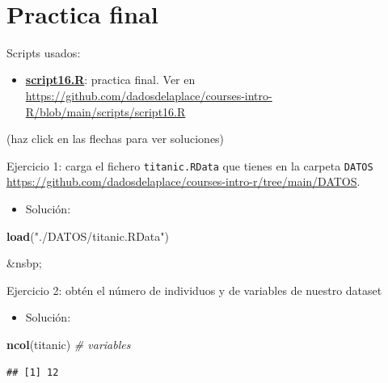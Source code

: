\documentclass[11pt,]{book}
\newenvironment{Shaded}{\begin{snugshade}}{\end{snugshade}}
\newcommand{\CommentTok}[1]{\textcolor[rgb]{0.37,0.37,0.37}{\textit{#1}}}
\newcommand{\KeywordTok}[1]{\textcolor[rgb]{0.27,0.27,0.27}{\textbf{#1}}}
\newcommand{\NormalTok}[1]{#1}
\newcommand{\StringTok}[1]{\textcolor[rgb]{0.5,0.5,0.5}{#1}}
\providecommand{\tightlist}{%
  \setlength{\itemsep}{0pt}\setlength{\parskip}{0pt}}
\begin{document}
~

\hypertarget{practica-final}{%
\section{Practica final}\label{practica-final}}

\begin{blackbox}

Scripts usados:

\begin{itemize}
\tightlist
\item
  \href{https://github.com/dadosdelaplace/courses-intro-R/blob/main/scripts/script16.R}{\textbf{script16.R}}: practica final. Ver en \url{https://github.com/dadosdelaplace/courses-intro-R/blob/main/scripts/script16.R}
\end{itemize}


\end{blackbox}

(haz click en las flechas para ver soluciones)

Ejercicio 1: carga el fichero \texttt{titanic.RData} que tienes en la carpeta \texttt{DATOS} \url{https://github.com/dadosdelaplace/courses-intro-r/tree/main/DATOS}.

\begin{itemize}
\tightlist
\item
  Solución:
\end{itemize}

\begin{Shaded}
\begin{Highlighting}[]
\KeywordTok{load}\NormalTok{(}\StringTok{"./DATOS/titanic.RData"}\NormalTok{)}
\end{Highlighting}
\end{Shaded}

\&nsbp;

Ejercicio 2: obtén el número de individuos y de variables de nuestro dataset

\begin{itemize}
\tightlist
\item
  Solución:
\end{itemize}

\begin{Shaded}
\begin{Highlighting}[]
\KeywordTok{ncol}\NormalTok{(titanic) }\CommentTok{# variables}
\end{Highlighting}
\end{Shaded}

\begin{verbatim}
## [1] 12
\end{verbatim}
\end{document}
